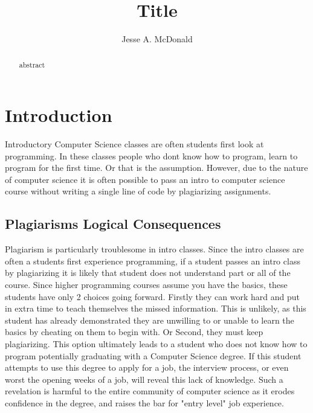 \documentclass[12pt,final,thesis,actual]{uhthesis}
\title{Title}
\author{Jesse A. McDonald}
\begin{document}
\maketitle
\begin{frontmatter}


\copyrightpage



\begin{abstract}
abstract
\end{abstract}
\tableofcontents

\listoftables

\listoffigures

\end{frontmatter}

\chapter{\textbf{Introduction}}
	Introductory Computer Science classes are often students first look at programming.  In these classes people who dont know how to program, learn to program for the first time.  Or that is the assumption.  However, due to the nature of computer science it is often possible to pass an intro to computer science course without writing a single line of code by plagiarizing assignments.
	\section{Plagiarisms Logical Consequences}
		Plagiarism is particularly troublesome in intro classes.  Since the intro classes are often a students first experience programming, if a student passes an intro class by plagiarizing it is likely that student does not understand part or all of the course.  Since higher programming courses assume you have the basics, these students have only 2 choices going forward.  Firstly they can work hard and put in extra time to teach themselves the missed information.  This is unlikely, as this student has already demonstrated they are unwilling to or unable to learn the basics by cheating on them to begin with.
		Or Second, they must keep plagiarizing.  This option ultimately leads to a student who does not know how to program potentially graduating with a Computer Science degree.  If this student attempts to use this degree to apply for a job, the interview process, or even worst the opening weeks of a job, will reveal this lack of knowledge.  Such a revelation is harmful to the entire community of computer science as it erodes confidence in the degree, and raises the bar for "entry level" job experience.
\end{document}
